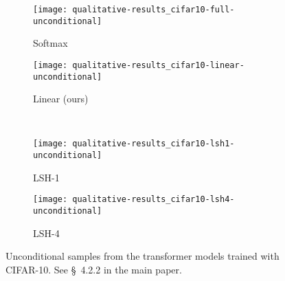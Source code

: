\documentclass{article}
\begin{document}
\begin{figure*}[h]
    \centering
    \begin{subfigure}[t]{0.4\columnwidth}
        \texttt{[image: qualitative-results\_cifar10-full-unconditional]}
        \caption{Softmax}
    \end{subfigure}
    \quad
    \begin{subfigure}[t]{0.4\columnwidth}
        \texttt{[image: qualitative-results\_cifar10-linear-unconditional]}
        \caption{Linear (ours)}
    \end{subfigure}\\[1em]
    \begin{subfigure}[t]{0.4\columnwidth}
        \texttt{[image: qualitative-results\_cifar10-lsh1-unconditional]}
        \caption{LSH-1}
    \end{subfigure}
    \quad
    \begin{subfigure}[t]{0.4\columnwidth}
        \texttt{[image: qualitative-results\_cifar10-lsh4-unconditional]}
        \caption{LSH-4}
    \end{subfigure}
    \caption{Unconditional samples from the transformer models trained with
             CIFAR-10. See \S~{4.2.2} in the main paper.}
    \label{fig:cifar_unconditional}
\end{figure*}
\end{document}

